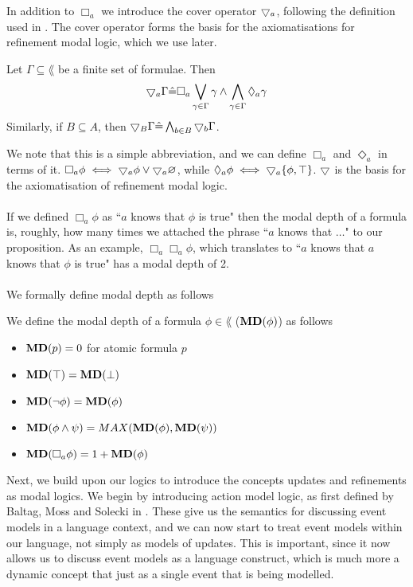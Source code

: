 In addition to $\Box_a$ we introduce the cover operator $\bigtriangledown_a$, following the definition used in
\cite{venemaproofsystems}.
The cover operator forms the basis for the axiomatisations for refinement modal logic, which we use
later.

\begin{defn} \label{coverDef}
Let $\Gamma \subseteq \lang$ be a finite set of formulae.
Then
\[
  \bigtriangledown_a \Gamma \hat{=} \Box_a \bigvee_{\gamma \in \Gamma} \gamma \land
  \bigwedge_{\gamma \in \Gamma} \Diamond_a \gamma
\]
Similarly, if $B \subseteq A$, then $\bigtriangledown_B \Gamma \hat{=} \bigwedge_{b \in B}
\bigtriangledown_b \Gamma$.
\end{defn}
We note that this is a simple abbreviation, and we can define $\Box_a$ and
$\Diamond_a$ in terms of it.
$\Box_a \phi \iff \bigtriangledown_a \phi \lor \bigtriangledown_a \varnothing$, while $\Diamond_a
\phi \iff \bigtriangledown_a \{\phi, \top\}$.
$\bigtriangledown$ is the basis for the axiomatisation of refinement modal logic.\\
\\
If we defined $\Box_a \phi$ as ``$a$ knows that $\phi$ is true" then the modal depth of a formula is, roughly,
how many times we attached the phrase ``$a$ knows that $\ldots$" to our proposition.
As an example, $\Box_a \Box_a \phi$, which translates to ``$a$ knows that $a$ knows that $\phi$ is
true" has a modal depth of 2.\\
\\
We formally define modal depth as follows

\begin{defn} \label{modalDepth}
We define the modal depth of a formula $\phi \in \lang$ (${\bf MD}(\phi)$) as follows
\begin{itemize}
	\item ${\bf MD}(p) = 0$ for atomic formula $p$
	\item ${\bf MD}(\top) = {\bf MD}(\bot)$
	\item ${\bf MD}(\neg \phi) = {\bf MD}(\phi)$
	\item ${\bf MD}(\phi \land \psi) = MAX({\bf MD}(\phi), {\bf MD}(\psi))$
	\item ${\bf MD}(\Box_a \phi) = 1 + {\bf MD}(\phi)$
\end{itemize}
\end{defn}

Next, we build upon our logics to introduce the concepts updates and refinements as modal logics.
We begin by introducing action model logic, as first defined by Baltag, Moss and Solecki in
\cite{baltag1998lpa}.
These give us the semantics for discussing event models in a language context, and we can now start
to treat event models within our language, not simply as models of updates.
This is important, since it now allows us to discuss event models as a language construct, which is
much more a dynamic concept that just as a single event that is being modelled.

